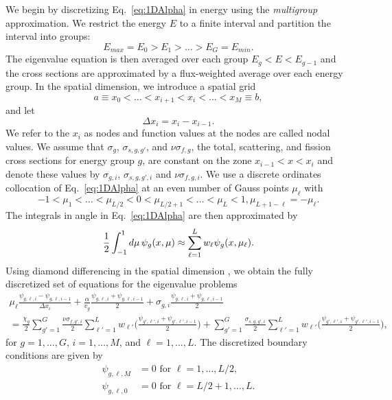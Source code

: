 We begin by discretizing Eq.~\ref{eq:1DAlpha} in energy using the \textit{multigroup} approximation. We restrict the energy $E$ to a finite interval and partition the interval into groups:
\begin{equation}
	E_{max} = E_{0} > E_{1} > \dots > E_{G} = E_{min}.
\end{equation}
The eigenvalue equation is then averaged over each group $E_{g} < E < E_{g-1}$ and the cross sections are approximated by a flux-weighted average over each energy group. In the spatial dimension, we introduce a spatial grid
\begin{equation}
	a \equiv x_{0} < \dots < x_{i+1} < x_{i} < \dots < x_{M} \equiv b,
\end{equation}
and let 
\begin{equation}
\Delta x_{i} = x_{i} - x_{i-1}.
\end{equation} 
We refer to the $x_{i}$ as nodes and function values at the nodes are called nodal values. We assume that $\sigma_{g}$, $\sigma_{s,g,g'}$, and $\nu\sigma_{f,g}$, the total, scattering, and fission cross sections for energy group $g$, are constant on the zone $x_{i-1} < x < x_{i}$ and denote these values by $\sigma_{g,i}$, $\sigma_{s,g,g',i}$ and $\nu\sigma_{f,g,i}$. We use a discrete ordinates collocation of Eq.~\ref{eq:1DAlpha} at an even number of Gauss points $\mu_{\ell}$ with
\begin{equation}
	-1 < \mu_{1} < \dots < \mu_{L/2} < 0 < \mu_{L/2+1} < \dots < \mu_{L} < 1, \mu_{L+1-\ell} = - \mu_{\ell}.
\end{equation}
The integrals in angle in Eq.~\ref{eq:1DAlpha} are then approximated by
\begin{equation}
	\frac{1}{2} \int_{-1}^{1} \mathop{}\!d \mu \, \psi_{g}(x, \mu) \approx \sum_{\ell=1}^{L} w_{\ell} \psi_{g}(x, \mu_{\ell}).
\end{equation}
Using diamond differencing in the spatial dimension \cite{lewis_computational_1984}, we obtain the fully discretized set of equations for the eigenvalue problems
\begin{multline}
	\mu_{\ell} \frac{ \psi_{g,\ell,i} - \psi_{g, \ell, i-1}}{\Delta x_{i}} + \frac{\alpha}{v_{g}} \frac{\psi_{g,\ell,i} + \psi_{g, \ell, i-1}}{2} + \sigma_{g,i} \frac{\psi_{g,\ell,i} + \psi_{g, \ell, i-1}}{2} \\ = \frac{\chi_{g}}{2} \sum_{g'=1}^{G} \frac{\nu\sigma_{f,g',i}}{2} \sum_{\ell' = 1}^{L} w_{\ell'} \bigg ( \frac{\psi_{g',\ell',i} + \psi_{g',\ell',i-1} }{2} \bigg ) + \sum_{g'=1}^{G} \frac{\sigma_{s,g,g',i}}{2} \sum_{\ell' = 1}^{L} w_{\ell'} \bigg ( \frac{\psi_{g',\ell',i} + \psi_{g',\ell',i-1} }{2} \bigg ),
\label{eq:AlphaSlab}
\end{multline}
for $g = 1, \dots, G$, $i = 1, \dots, M$, and $\ell = 1, \dots, L$. The discretized boundary conditions are given by
\begin{align}
\psi_{g,\ell,M} &= 0 \text{ for } \ell = 1, \dots, L/2,  \\
\psi_{g,\ell,0} &= 0 \text{ for } \ell = L/2+1, \dots, L.
\end{align}


